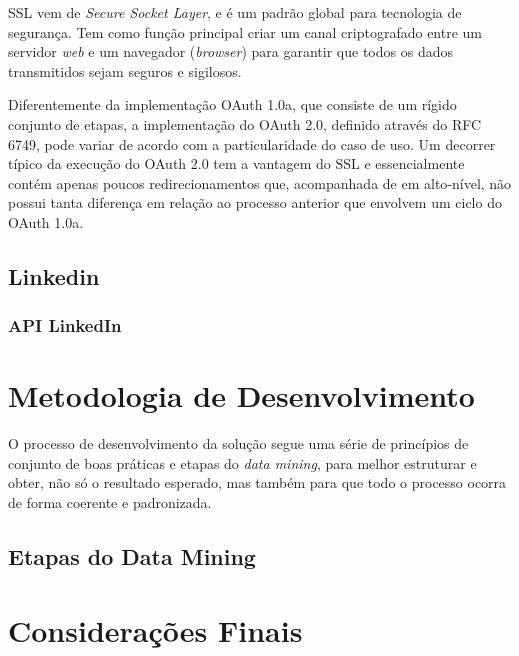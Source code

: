 SSL vem de \textit{Secure Socket Layer}, e é um padrão global para tecnologia de segurança. Tem como função principal criar um canal criptografado entre um servidor \textit{web} e um navegador (\textit{browser}) para garantir que todos os dados transmitidos sejam seguros e sigilosos.

Diferentemente da implementação OAuth 1.0a, que consiste de um rígido conjunto de etapas, a implementação do OAuth 2.0, definido através do RFC 6749, pode variar de acordo com a particularidade do caso de uso. Um decorrer típico da execução do OAuth 2.0 tem a vantagem do SSL e essencialmente contém apenas poucos redirecionamentos que, acompanhada de em alto-nível, não possui tanta diferença em relação ao processo anterior que envolvem um ciclo do OAuth 1.0a.


\subsection{Linkedin}\label{sec:linkedin}
\subsubsection{API LinkedIn}

\section{Metodologia de Desenvolvimento}
O processo de desenvolvimento da solução segue uma série de princípios de conjunto de boas práticas e etapas do \textit{data mining}, para melhor estruturar e obter, não só o resultado esperado, mas também para que todo o processo ocorra de forma coerente e padronizada.

\subsection{Etapas do Data Mining}\label{sec:etapas-data-mining}

\section{Considerações Finais}

